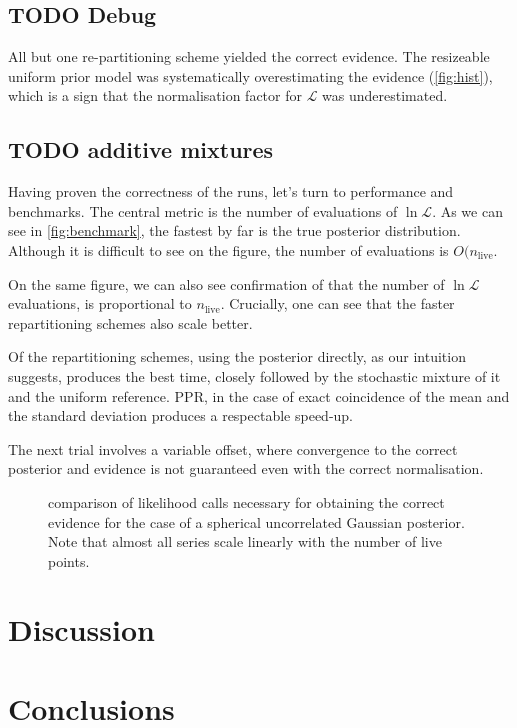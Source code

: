\documentclass[usenatbib]{mnras}
\begin{document}
\subsection{{\bfseries\sffamily TODO} Debug}
\label{sec:org0d7a814}
All but one re-partitioning scheme yielded the correct
evidence. The resizeable uniform prior model was systematically
overestimating the evidence (\autoref{fig:hist}), which is a sign
that the normalisation factor for \(\mathcal{L}\) was underestimated.
\subsection{{\bfseries\sffamily TODO} additive mixtures}
\label{sec:orgf7c2344}

Having proven the correctness of the runs, let's turn to
performance and benchmarks. The central metric is the number of
evaluations of \(\ln \mathcal{L}\). As we can see in
\autoref{fig:benchmark}, the fastest by far is the true posterior
distribution. Although it is difficult to see on the figure, the
number of evaluations is \(O(n_\text{live}\). 

On the same figure, we can also see confirmation of that the number
of \(\ln \mathcal{L}\) evaluations, is proportional to
\(n_\text{live}\). Crucially, one can see that the faster
repartitioning schemes also scale better. 

Of the repartitioning schemes, using the posterior directly, as our
intuition suggests, produces the best time, closely followed by the
stochastic mixture of it and the uniform reference. PPR, in the
case of exact coincidence of the mean and the standard deviation
produces a respectable speed-up. 

The next trial involves a variable offset, where convergence to the
correct posterior and evidence is not guaranteed even with the
correct normalisation. 


\begin{figure}
  
\caption{\label{org11cf640}
comparison of likelihood calls necessary for obtaining the correct evidence for the case of a spherical uncorrelated Gaussian posterior. Note that almost all series scale linearly with the number of live points.}
\end{figure}


\section{Discussion}
\label{sec:org69b6908}
\section{Conclusions}
\label{sec:org82af994}
\end{document}
